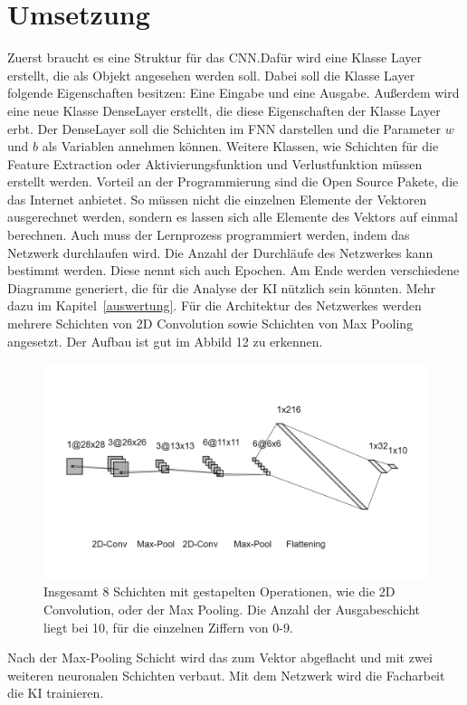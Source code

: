 \documentclass[11pt]{article}
\begin{document}
\section{Umsetzung}
Zuerst braucht es eine Struktur für das CNN.\@ Dafür wird eine Klasse Layer erstellt, die als Objekt angesehen werden soll. Dabei soll die Klasse Layer folgende
Eigenschaften besitzen: Eine Eingabe und eine Ausgabe. Außerdem wird eine neue Klasse DenseLayer erstellt, die diese Eigenschaften der Klasse Layer erbt.
Der DenseLayer soll die Schichten im FNN darstellen und die Parameter $w$ und $b$ als Variablen annehmen können. Weitere Klassen, wie Schichten für die
Feature Extraction oder Aktivierungsfunktion und Verlustfunktion müssen erstellt werden. Vorteil an der Programmierung sind die Open Source Pakete, die das
Internet anbietet. So müssen nicht die einzelnen Elemente der Vektoren ausgerechnet werden, sondern es lassen sich alle Elemente des Vektors auf einmal berechnen.
Auch muss der Lernprozess programmiert werden, indem das Netzwerk durchlaufen wird. Die Anzahl der Durchläufe des Netzwerkes kann bestimmt werden.
Diese nennt sich auch Epochen. Am Ende werden verschiedene Diagramme generiert, die für die Analyse der KI nützlich sein könnten.
Mehr dazu im Kapitel~\ref{auswertung}. Für die Architektur des Netzwerkes werden mehrere Schichten von 2D Convolution sowie Schichten von Max Pooling angesetzt.
Der Aufbau ist gut im Abbild 12 zu erkennen.
\begin{figure}[h]
    \centering
    \includegraphics[width=325pt, keepaspectratio]{images/cnn}
    \caption[Architektur eines CNNs]{Insgesamt 8 Schichten mit gestapelten Operationen, wie die 2D Convolution, oder der Max Pooling.
    Die Anzahl der Ausgabeschicht liegt bei 10, für die einzelnen Ziffern von 0-9.}
\end{figure}
Nach der Max-Pooling Schicht wird das zum Vektor abgeflacht und mit zwei weiteren neuronalen Schichten verbaut.
Mit dem Netzwerk wird die Facharbeit die KI trainieren.
\end{document}
